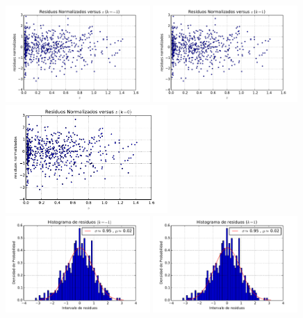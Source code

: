 \begin{figure}[h!]
  \centering
\includegraphics[width=0.49\textwidth]{fig/residuosnork-1.pdf}
\includegraphics[width=0.49\textwidth]{fig/residuosnork1.pdf}
\includegraphics[width=0.55\textwidth]{fig/residuosnor.pdf}
\includegraphics[width=0.49\textwidth]{fig/gaussk-1.pdf}
\includegraphics[width=0.49\textwidth]{fig/gaussk1.pdf}

\end{figure}
